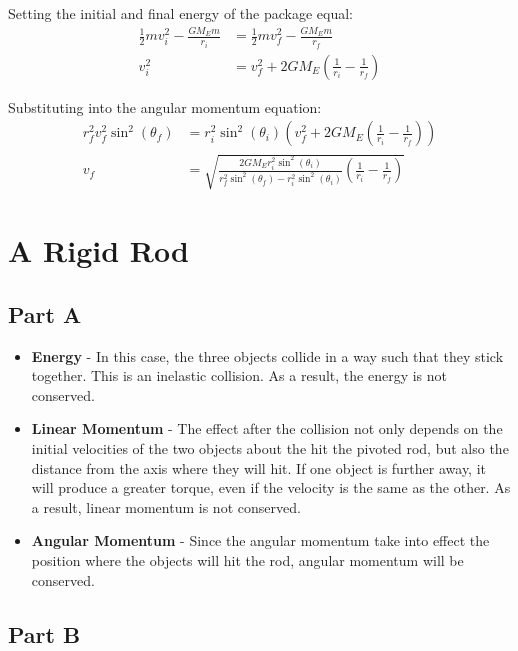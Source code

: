 \documentclass{article}
\begin{document}
Setting the initial and final energy of the package equal:
\begin{align*}
    \frac{1}{2} m v_i^2 - \frac{G M_E m}{r_i} &= \frac{1}{2} m v_f^2 - \frac{G
    M_E m}{r_f} \\
    v_i^2 &= v_f^2 + 2 G M_E \left( \frac{1}{r_i} - \frac{1}{r_f} \right)
\end{align*}

Substituting into the angular momentum equation:
\begin{align*}
    r_f^2 v_f^2 \sin^2(\theta_f) &= r_i^2 \sin^2(\theta_i) \left( v_f^2 + 2 G 
    M_E \left( \frac{1}{r_i} - \frac{1}{r_f} \right) \right) \\
    v_f &= \sqrt{ \frac{ 2 G M_E r_i^2 \sin^2(\theta_i) }{ r_f^2
    \sin^2(\theta_f) - r_i^2 \sin^2(\theta_i) } \left( \frac{1}{r_i} - 
    \frac{1}{r_f} \right) }
\end{align*}

\section{A Rigid Rod}

\subsection*{Part A}

\begin{itemize}
    \item \textbf{Energy} - In this case, the three objects collide in a way
        such that they stick together. This is an inelastic collision. As a
        result, the energy is not conserved.

    \item \textbf{Linear Momentum} - The effect after the collision not only
        depends on the initial velocities of the two objects about the hit the
        pivoted rod, but also the distance from the axis where they will hit. If
        one object is further away, it will produce a greater torque, even if
        the velocity is the same as the other. As a result, linear momentum is
        not conserved.

    \item \textbf{Angular Momentum} - Since the angular momentum take into
        effect the position where the objects will hit the rod, angular momentum
        will be conserved.
\end{itemize}

\subsection*{Part B}
\end{document}
